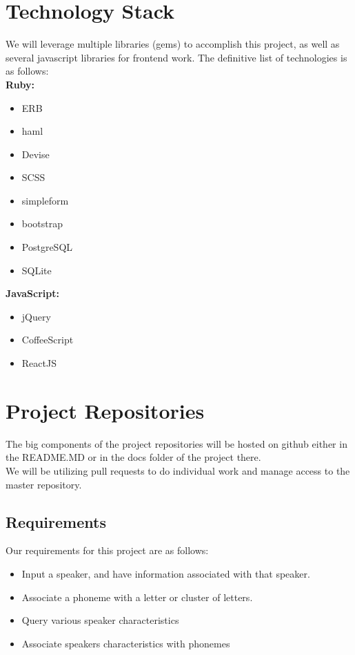 \documentclass[12pt, a4paper, oneside]{article}
\begin{document}
\section*{Technology Stack}
We will leverage multiple libraries (gems) to accomplish this project, as well as several javascript libraries for frontend work. The definitive list of technologies is as follows: \\

\textbf{Ruby:}
\begin{itemize}
\item ERB
\item haml
\item Devise
\item SCSS
\item simpleform
\item bootstrap
\item PostgreSQL
\item SQLite \\
\end{itemize}
\textbf{JavaScript:}
\begin{itemize}
\item jQuery
\item CoffeeScript
\item ReactJS
\end{itemize}

\section*{Project Repositories}
The big components of the project repositories will be hosted on github either in the README.MD or in the docs folder of the project there.  \\

We will be utilizing pull requests to do individual work and manage access to the master repository.

\subsection*{Requirements}
Our requirements for this project are as follows:

\begin{itemize}
\item Input a speaker, and have information associated with that speaker.
\item Associate a phoneme with a letter or cluster of letters.
\item Query various speaker characteristics
\item Associate speakers characteristics with phonemes
\end{itemize}
\end{document}
